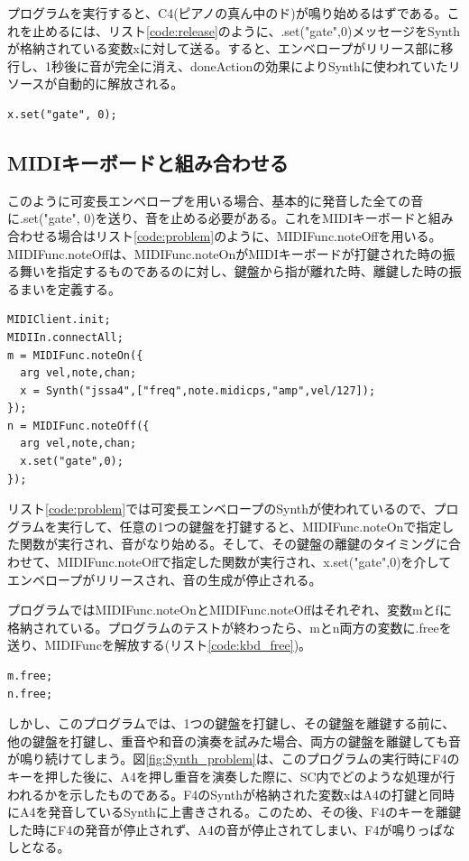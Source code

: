 \documentclass{jsarticle}
\begin{document}
プログラムを実行すると、C4(ピアノの真ん中のド)が鳴り始めるはずである。これを止めるには、リスト\ref{code:release}のように、.set("gate",0)メッセージをSynthが格納されている変数xに対して送る。すると、エンベロープがリリース部に移行し、1秒後に音が完全に消え、doneActionの効果によりSynthに使われていたリソースが自動的に解放される。
\begin{lstlisting}[caption=可変長エンベロープのリリース,label=code:release]
x.set("gate", 0);
\end{lstlisting}

\subsection{MIDIキーボードと組み合わせる}
このように可変長エンベロープを用いる場合、基本的に発音した全ての音に.set("gate", 0)を送り、音を止める必要がある。これをMIDIキーボードと組み合わせる場合はリスト\ref{code:problem}のように、MIDIFunc.noteOffを用いる。MIDIFunc.noteOffは、MIDIFunc.noteOnがMIDIキーボードが打鍵された時の振る舞いを指定するものであるのに対し、鍵盤から指が離れた時、離鍵した時の振るまいを定義する。

\begin{lstlisting}[caption=可変長エンベロープとMIDIキーボード,label=code:problem]
MIDIClient.init;
MIDIIn.connectAll;
m = MIDIFunc.noteOn({
  arg vel,note,chan;
  x = Synth("jssa4",["freq",note.midicps,"amp",vel/127]);
});
n = MIDIFunc.noteOff({
  arg vel,note,chan;
  x.set("gate",0);
});
\end{lstlisting}

リスト\ref{code:problem}では可変長エンベロープのSynthが使われているので、プログラムを実行して、任意の1つの鍵盤を打鍵すると、MIDIFunc.noteOnで指定した関数が実行され、音がなり始める。そして、その鍵盤の離鍵のタイミングに合わせて、MIDIFunc.noteOffで指定した関数が実行され、x.set("gate",0)を介してエンベロープがリリースされ、音の生成が停止される。

プログラムではMIDIFunc.noteOnとMIDIFunc.noteOffはそれぞれ、変数mとfに格納されている。プログラムのテストが終わったら、mとn両方の変数に.freeを送り、MIDIFuncを解放する(リスト\ref{code:kbd_free})。

\begin{lstlisting}[caption=MIDIFuncの解放,label=code:kbd_free]
m.free;
n.free;
\end{lstlisting}

しかし、このプログラムでは、1つの鍵盤を打鍵し、その鍵盤を離鍵する前に、他の鍵盤を打鍵し、重音や和音の演奏を試みた場合、両方の鍵盤を離鍵しても音が鳴り続けてしまう。図\ref{fig:Synth_problem}は、このプログラムの実行時にF4のキーを押した後に、A4を押し重音を演奏した際に、SC内でどのような処理が行われるかを示したものである。F4のSynthが格納された変数xはA4の打鍵と同時にA4を発音しているSynthに上書きされる。このため、その後、F4のキーを離鍵した時にF4の発音が停止されず、A4の音が停止されてしまい、F4が鳴りっぱなしとなる。
\end{document}
